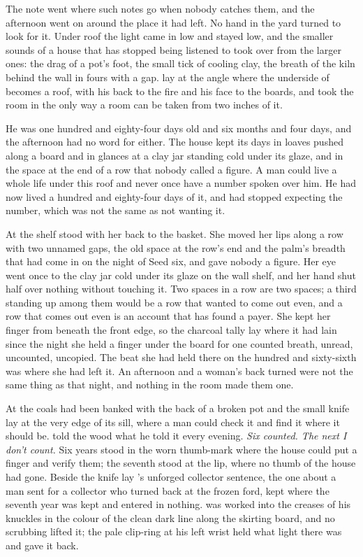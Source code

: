The note went where such notes go when nobody catches them, and the afternoon went on around the place it had left. No hand in the yard turned to look for it. Under  roof the light came in low and stayed low, and the smaller sounds of a house that has stopped being listened to took over from the larger ones: the drag of a pot's foot, the small tick of cooling clay, the breath of the kiln behind the wall in fours with a gap.  lay at the angle where the underside of  becomes a roof, with his back to the fire and his face to the boards, and took the room in the only way a room can be taken from two inches of it.

He was one hundred and eighty-four days old and six months and four days, and the afternoon had no word for either. The house kept its days in loaves pushed along a board and in glances at a clay jar standing cold under its glaze, and in the space at the end of a row that nobody called a figure. A man could live a whole life under this roof and never once have a number spoken over him. He had now lived a hundred and eighty-four days of it, and had stopped expecting the number, which was not the same as not wanting it.

At the shelf  stood with her back to the basket. She moved her lips along a row with two unnamed gaps, the old space at the row's end and the palm's breadth that had come in on the night of Seed six, and gave nobody a figure. Her eye went once to the clay jar cold under its glaze on the wall shelf, and her hand shut half over nothing without touching it. Two spaces in a row are two spaces; a third standing up among them would be a row that wanted to come out even, and a row that comes out even is an account that has found a payer. She kept her finger from beneath the front edge, so the charcoal tally lay where it had lain since the night she held a finger under the board for one counted breath, unread, uncounted, uncopied. The beat she had held there on the hundred and sixty-sixth was where she had left it. An afternoon and a woman's back turned were not the same thing as that night, and nothing in the room made them one.

\scenebreak

At  the coals had been banked with the back of a broken pot and the small knife lay at the very edge of its sill, where a man could check it and find it where it should be.  told the wood what he told it every evening. \emph{Six counted. The next I don't count.} Six years stood in the worn thumb-mark where the house could put a finger and verify them; the seventh stood at the lip, where no thumb of the house had gone. Beside the knife lay 's unforged collector sentence, the one about a man sent for a collector who turned back at the frozen ford, kept where the seventh year was kept and entered in nothing.  was worked into the creases of his knuckles in the colour of the clean dark line along the skirting board, and no scrubbing lifted it; the pale clip-ring at his left wrist held what light there was and gave it back.

